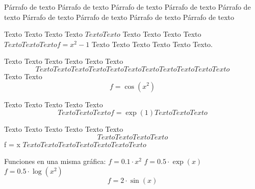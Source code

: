 \documentclass[a4paper]{article}
\begin{document}
Párrafo de texto Párrafo de texto Párrafo de texto Párrafo de texto Párrafo de texto Párrafo de texto Párrafo de texto Párrafo de texto Párrafo de texto

Texto Texto Texto Texto $Texto Texto $ Texto Texto Texto Texto $Texto Texto Texto f=x^2 - 1$ Texto Texto Texto Texto Texto Texto.

Texto Texto Texto Texto Texto Texto $$ Texto Texto Texto Texto Texto Texto Texto
Texto Texto Texto Texto $$ Texto Texto $$ f = \cos(x^2) $$

Texto Texto Texto Texto Texto $$ Texto Texto Texto f =\exp(1) Texto Texto Texto $$

Texto Texto Texto Texto Texto Texto $$ Texto Texto Texto Texto  $$ f = x $ Texto Texto Texto Texto Texto Texto Texto $

Funciones en una misma gráfica:
$ f = 0.1 \cdot x^2$
$ f = 0.5 \cdot \exp(x) $
$ f = 0.5 \cdot \log(x^2) $\\
$$ f = 2 \cdot \sin(x) $$
\end{document}
